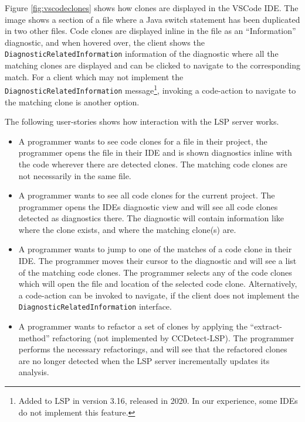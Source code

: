 Figure \ref{fig:vscodeclones} shows how clones are displayed in the VSCode IDE. The image
shows a section of a file where a Java switch statement has been duplicated in two other
files. Code clones are displayed inline in the file as an ``Information'' diagnostic, and
when hovered over, the client shows the \verb|DiagnosticRelatedInformation| information of
the diagnostic where all the matching clones are displayed and can be clicked to navigate
to the corresponding match. For a client which may not implement the
\verb|DiagnosticRelatedInformation| message\footnote{Added to LSP in version 3.16,
released in 2020. In our experience, some IDEs do not implement this feature.}, invoking a
code-action to navigate to the matching clone is another option.

The following user-stories shows how interaction with the LSP server works.

\begin{itemize} 

    \item A programmer wants to see code clones for a file in their project, the
        programmer opens the file in their IDE and is shown diagnostics inline with the
        code wherever there are detected clones. The matching code clones are not
        necessarily in the same file.

	\item A programmer wants to see all code clones for the current project. The
	      programmer opens the IDEs diagnostic view and will see all code clones detected
	      as diagnostics there. The diagnostic will contain information like where the clone
	      exists, and where the matching clone(s) are.

    \item A programmer wants to jump to one of the matches of a code clone in their IDE.
        The programmer moves their cursor to the diagnostic and will see a list of the
        matching code clones. The programmer selects any of the code clones which will
        open the file and location of the selected code clone. Alternatively, a
        code-action can be invoked to navigate, if the client does not implement the
        \verb|DiagnosticRelatedInformation| interface.

      \item A programmer wants to refactor a set of clones by applying the
          ``extract-method'' refactoring (not implemented by CCDetect-LSP). The programmer
          performs the necessary refactorings, and will see that the refactored clones are
          no longer detected when the LSP server incrementally updates its analysis.

\end{itemize}


